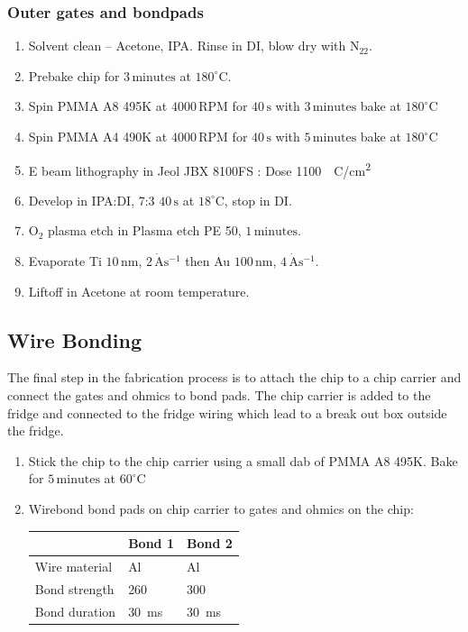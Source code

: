 \subsubsection{Outer gates and bondpads }

\begin{enumerate}
\item Solvent clean – Acetone, IPA. Rinse in DI, blow dry with $\mathrm{N_22}$.
\item Prebake chip for $3\,\mathrm{minutes}$ at $180^\circ$C.
\item Spin PMMA A8 495K at $4000\,\mathrm{RPM}$ for $40\,\mathrm{s}$ with $3\,\mathrm{minutes}$ bake at $180^\circ$C
\item Spin PMMA A4 490K at $4000\,\mathrm{RPM}$ for $40\,\mathrm{s}$ with $5\,\mathrm{minutes}$ bake at $180^\circ$C
\item E beam lithography in Jeol JBX 8100FS : Dose \qty{1100}{\mu C/cm^2}
\item Develop in IPA:DI, 7:3 $40\,\mathrm{s}$ at $18^\circ$C, stop in DI.
\item $\mathrm{O_2}$ plasma etch in Plasma etch PE 50, $1\,\mathrm{minutes}$.
\item Evaporate Ti $10\,\mathrm{nm}$, $2\,\mathrm{\dot{A}s^{-1}}$ then Au $100\,\mathrm{nm}$, $4\,\mathrm{\dot{A}s^{-1}}$.
\item Liftoff in Acetone at room temperature.
\end{enumerate}




\subsection{Wire Bonding}

The final step in the fabrication process is to attach the chip to a chip carrier and connect the gates and ohmics to bond pads. The chip carrier is added to the fridge and connected to the fridge wiring which lead to a break out box outside the fridge. 


\begin{enumerate}
\item Stick the chip to the chip carrier using a small dab of PMMA A8 495K. Bake for $5\,\mathrm{minutes}$ at $60^\circ$C
\item Wirebond bond pads on chip carrier to gates and ohmics on the chip:
\begin{table}[H]  
\centering
 \begin{tabular}{|p{3.0cm}|p{2.0cm}|p{2.0cm}|}
 \hline
  & Bond 1 & Bond 2\\
 \hline
 Wire material & Al & Al\\
 Bond strength & 260 & 300\\
 Bond duration & \qty{30}{ms} & \qty{30}{ms} \\
 \hline
 \end{tabular}
\label{tab:wire_bonding}
\end{table}
\end{enumerate}